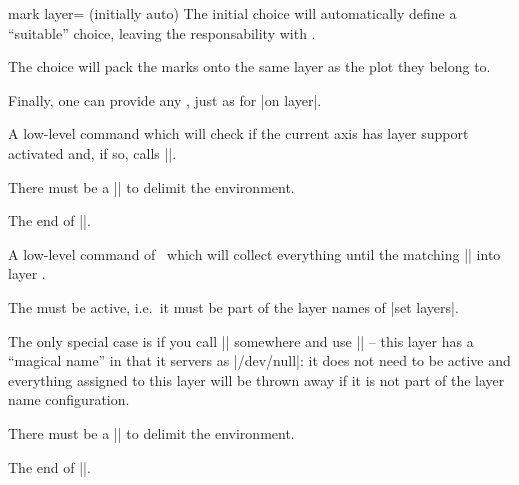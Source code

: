 {\begin{pgfplotskey}{mark layer= (initially auto)}
    The initial choice  will automatically define a ``suitable'' choice, leaving the responsability with \PGFPlots.

    The choice  will pack the marks onto the same layer as the plot they belong to.

    Finally, one can provide any , just as for |on layer|.
\end{pgfplotskey}

\begin{command}{\pgfplotsonlayer{}}
    A low-level command which will check if the current axis has layer support activated and, if so, calls |\pgfonlayer|.

    There must be a |\endpgfplotsonlayer| to delimit the environment.
\end{command}
\begin{command}{\endpgfplotsonlayer}
    The end of |\pgfplotsonlayer|.
\end{command}

\begin{command}{\pgfonlayer{}}
    A low-level command of \PGF\ which will collect everything until the matching |\endpgfonlayer| into layer .

    The  must be active, i.e.\ it must be part of the layer names of |set layers|. 
    
    The only special case is if you call || somewhere and use || -- this layer has a ``magical name'' in that it servers as |/dev/null|: it does not need to be active and everything assigned to this layer will be thrown away if it is not part of the layer name configuration.

    There must be a |\endpgfonlayer| to delimit the environment.
\end{command}
\begin{command}{\endpgfonlayer}
    The end of |\pgfonlayer|.
\end{command}
}
